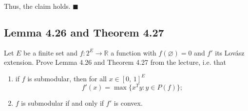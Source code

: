 \documentclass{article}
\let\emptyset\varnothing
\newcommand{\R}{\mathbb{R}}
\begin{document}
Thus, the claim holds. $\blacksquare$











  \subsection{Lemma 4.26 and Theorem 4.27}
  \begin{centerframebox}
    Let $E$ be a finite set and $f : 2^E \to \R$ a function with $f(\emptyset) = 0$ and $f'$ its Lovász extension.
    Prove Lemma 4.26 and Theorem 4.27 from the lecture, i.e. that
    \begin{enumerate}[label=(\roman*)]
      \item if $f$ is submodular, then for all $x \in [0,\, 1]^E$
      \[ f'(x) = \max\{x^Ty : y \in P(f) \}; \]
      \item $f$ is submodular if and only if $f'$ is convex.
    \end{enumerate}
  \end{centerframebox}
\end{document}
